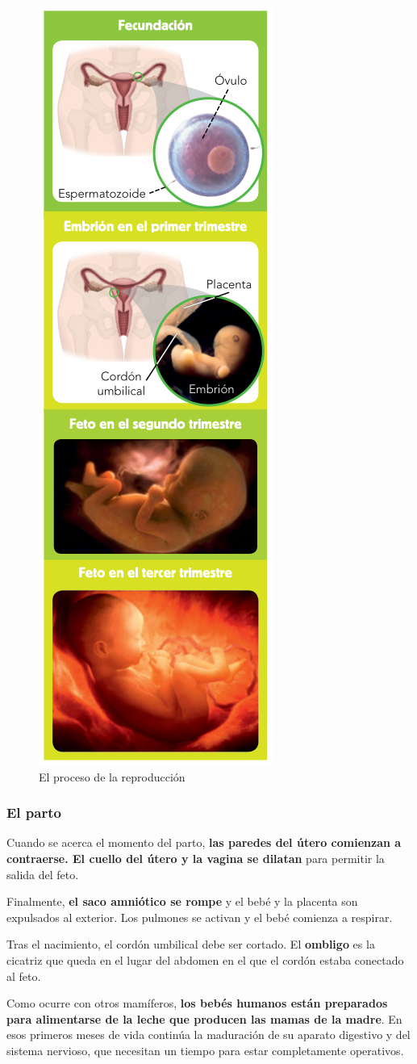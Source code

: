 \begin{figure}[!ht]
    \centering
    \includegraphics[width=0.3\linewidth]{Tema3/17_Proceso_reproduccion.png}
    \caption{El proceso de la reproducción}
    \label{fig:proceso-reproduccion}
\end{figure}

\subsubsection{El parto}

Cuando se acerca el momento del parto, \textbf{las paredes del útero comienzan a contraerse. El cuello del útero y la vagina se dilatan} para permitir la salida del feto.

\vspace{3mm}
Finalmente, \textbf{el saco amniótico se rompe} y el bebé y la placenta son expulsados al exterior. Los pulmones se activan y el bebé comienza a respirar.

\vspace{3mm}
Tras el nacimiento, el cordón umbilical debe ser cortado. El \textbf{ombligo} es la cicatriz que queda en el lugar del abdomen en el que el cordón estaba conectado al feto.

\vspace{3mm}
Como ocurre con otros mamíferos, \textbf{los bebés humanos están preparados para alimentarse de la leche que producen las mamas de la madre}. En esos primeros meses de vida continúa la maduración de su aparato digestivo y del sistema nervioso, que necesitan un tiempo para estar completamente operativos.

